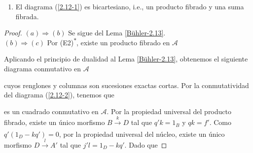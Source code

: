 \documentclass[tesis]{subfiles}
\begin{document}
\begin{Prop}
\begin{enumerate}[label=(\alph*)]
        \item El diagrama (\ref{2.12-1}) es bicartesiano, i.e., un producto fibrado y una suma fibrada.           
    \end{enumerate}
\end{Prop}

\begin{proof}\leavevmode

    $(a)\Rightarrow(b)$ Se sigue del Lema \ref{Bühler-2.13}. \\

    $(b)\Rightarrow(c)$ Por (E2)\textsuperscript{$\ast$}, existe un producto fibrado en $\mathscr{A}$
    \begin{center}
    \end{center}
    Aplicando el principio de dualidad al Lema \ref{Bühler-2.13}, obtenemos el siguiente diagrama conmutativo en $\mathscr{A}$
    \begin{center}
    \end{center}
    cuyos renglones y columnas son sucesiones exactas cortas. Por la conmutatividad del diagrama (\ref{2.12-2}), tenemos que
    \begin{center}
    \end{center}
    es un cuadrado conmutativo en $\mathscr{A}$. Por la propiedad universal del producto fibrado, existe un único morfismo $B\xrightarrow[]{k}D$ tal que $q'k=1_B$ y $qk=f'$. Como $q'(1_D - kq')=0$, por la propiedad universal del núcleo, existe un único morfismo $D\xrightarrow[]{l}A'$ tal que $j'l=1_D-kq'$. Dado que

\end{proof}
\end{document}
